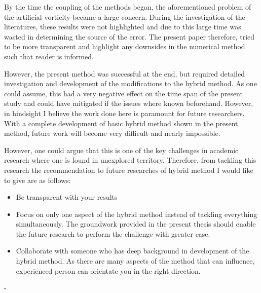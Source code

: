 By the time the coupling of the methods began, the aforementioned problem of the artificial vorticity became a large concern. During the investigation of the literatures, these results were not highlighted and due to this large time was wasted in determining the source of the error. The present paper therefore, tried to be more transparent and highlight any downsides in the numerical method such that reader is informed.

However, the present method was successful at the end, but required detailed investigation and development of the modifications to the hybrid method. As one could assume, this had a very negative effect on the time span of the present study and could have mitigated if the issues where known beforehand. However, in hindsight I believe the work done here is paramount for future researchers. With a complete development of basic hybrid method shown in the present method, future work will become very difficult and nearly impossible. 

However, one could argue that this is one of the key challenges in academic research where one is found in unexplored territory. Therefore, from tackling this research the recommendation to future researches of hybrid method I would like to give are as follows:
\begin{itemize}
\item Be transparent with your results
\item Focus on only one aspect of the hybrid method instead of tackling everything simultaneously. The groundwork provided in the present thesis should enable the future research to perform the challenge with greater ease.
\item Collaborate with someone who has deep background in development of the hybrid method. As there are many aspects of the method that can influence, experienced person can orientate you in the right direction.
\end{itemize}








- %




